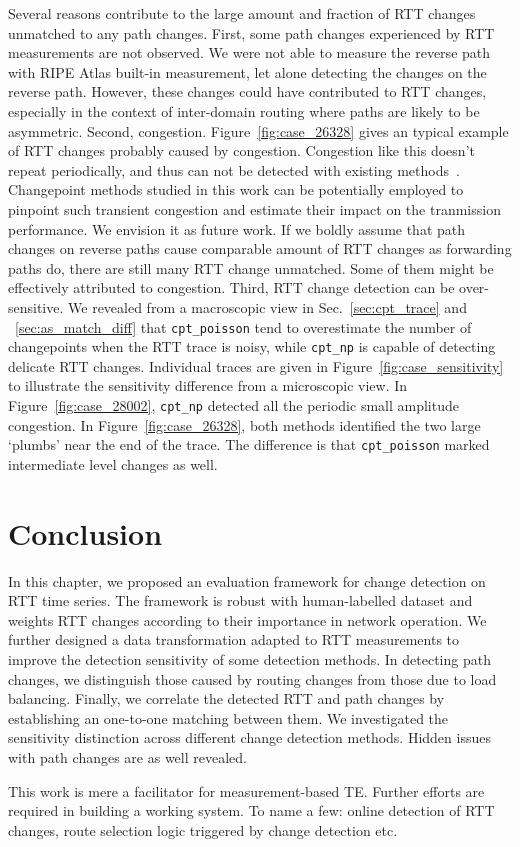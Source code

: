 Several reasons contribute to the large amount and fraction of RTT changes unmatched to any path changes.
First, some path changes experienced by RTT measurements are not observed. We were not able to measure the reverse path with RIPE Atlas built-in measurement, let alone detecting the changes on the reverse path. However, these changes could have contributed to RTT changes, especially in the context of inter-domain routing where paths are likely to be asymmetric.
Second, congestion. Figure~\ref{fig:case_26328} gives an typical example of RTT changes probably caused by congestion.
Congestion like this doesn't repeat periodically, and thus can not be detected with existing methods~\cite{Luckie2014}.
Changepoint methods studied in this work can be potentially employed to pinpoint such transient congestion and estimate their
impact on the tranmission performance. We envision it as future work.
If we boldly assume that path changes on reverse paths cause comparable amount of RTT changes as forwarding paths do, there are still many RTT change unmatched. Some of them might be effectively attributed to congestion.
Third, RTT change detection can be over-sensitive. We revealed from a macroscopic view in Sec.~\ref{sec:cpt_trace} and ~\ref{sec:as_match_diff} that \texttt{cpt\_poisson} tend to overestimate the number of changepoints when the RTT trace is noisy, while \texttt{cpt\_np} is capable of detecting delicate RTT changes. Individual traces are given in Figure~\ref{fig:case_sensitivity} to illustrate the sensitivity difference from a microscopic view. In Figure~\ref{fig:case_28002}, \texttt{cpt\_np} detected all the periodic small amplitude congestion. In Figure~\ref{fig:case_26328}, both methods identified the two large `plumbs' near the end of the trace. The difference is that \texttt{cpt\_poisson} marked intermediate level changes as well.

\section*{Conclusion}
In this chapter, we proposed an evaluation framework for change detection on RTT time series.
The framework is robust with human-labelled dataset and weights RTT changes according to their importance in network operation. We further designed a data transformation adapted to RTT measurements to improve the detection sensitivity of some detection methods.
In detecting path changes, we distinguish those caused by routing changes from those due to load balancing.
Finally, we correlate the detected RTT and path changes by establishing an one-to-one matching between them. 
We investigated the sensitivity distinction across different change detection methods. 
Hidden issues with path changes are as well revealed.

This work is mere a facilitator for measurement-based TE. Further efforts are required in building a working system. To name a few: online detection of RTT changes, route selection logic triggered by change detection  etc.
